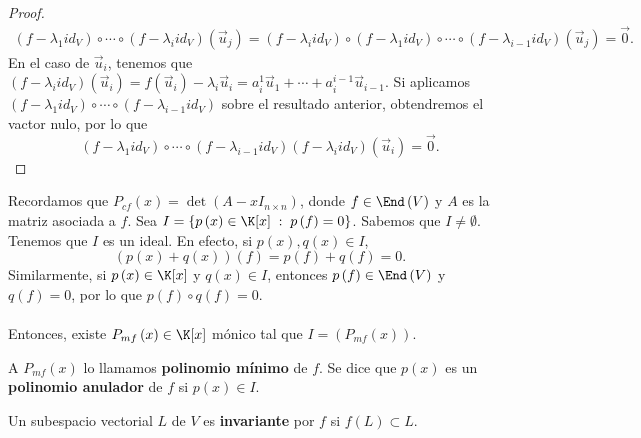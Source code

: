 \begin{proof}
\[\begin{split}
\left(f - \lambda_{1}id _{V}\right)\circ \cdots\circ \left(f - \lambda_{i}id _{V}\right)\left(\vec{u}_{j}\right) = \left(f - \lambda_{i}id _{V}\right)\circ\left(f - \lambda_{1}id _{V}\right)\circ \cdots\circ \left(f - \lambda_{i-1}id _{V}\right)\left(\vec{u}_{j}\right) = \vec{0}.
\end{split}
\]
En el caso de $\displaystyle \vec{u}_{i} $, tenemos que $\displaystyle \left(f - \lambda_{i}id _{V}\right)\left(\vec{u}_{i}\right) = f\left(\vec{u}_{i}\right)-\lambda_{i}\vec{u}_{i} =  a^{1}_{i}\vec{u}_{1} + \cdots + a^{i -1}_{i}\vec{u}_{i-1} $. Si aplicamos $\displaystyle \left(f - \lambda_{1}id _{V}\right) \circ \cdots \circ \left(f - \lambda_{i - 1}id _{V}\right) $ sobre el resultado anterior, obtendremos el vactor nulo, por lo que
\[ \left(f - \lambda_{1}id _{V}\right) \circ \cdots \circ \left(f - \lambda_{i - 1}id _{V}\right)\left(f - \lambda_{i}id _{V}\right)\left(\vec{u}_{i}\right) = \vec{0} .\]
\end{proof}
Recordamos que $\displaystyle P_{cf}\left(x\right) = \det\left(A - xI_{n\times n}\right) $, donde $\displaystyle f \in \End\left(V\right) $ y $\displaystyle A $ es la matriz asociada a $\displaystyle f $. Sea $\displaystyle I = \left\{ p\left(x\right) \in \K[x] \; : \; p\left(f\right) = 0\right\}  $. Sabemos que $\displaystyle I \neq \emptyset $. 
Tenemos que $\displaystyle I $ es un ideal. En efecto, si $\displaystyle p\left(x\right), q\left(x\right) \in I $,
\[ \left(p\left(x\right)+q\left(x\right)\right)\left(f\right) = p\left(f\right) + q\left(f\right)= 0 .\]
Similarmente, si $\displaystyle p\left(x\right) \in \K[x] $ y $\displaystyle q\left(x\right) \in I $, entonces $\displaystyle p\left(f\right) \in \End\left(V\right) $ y $\displaystyle q\left(f\right) = 0 $, por lo que $\displaystyle p\left(f\right) \circ q\left(f\right) = 0 $. \\ \\
Entonces, existe $\displaystyle P_{mf}\left(x\right) \in \K[x] $ mónico tal que $\displaystyle I = \left(P_{mf}\left(x\right)\right) $.
\begin{fdefinition}[]
\normalfont A $\displaystyle P_{mf}\left(x\right) $ lo llamamos \textbf{polinomio mínimo} de $\displaystyle f $. Se dice que $\displaystyle p\left(x\right) $ es un \textbf{polinomio anulador} de $\displaystyle f $ si $\displaystyle p\left(x\right) \in I $.
\end{fdefinition}
\begin{fdefinition}[]
\normalfont Un subespacio vectorial $\displaystyle L $ de $\displaystyle V $ es \textbf{invariante} por $\displaystyle f $ si $\displaystyle f\left(L\right) \subset L $.
\end{fdefinition}

